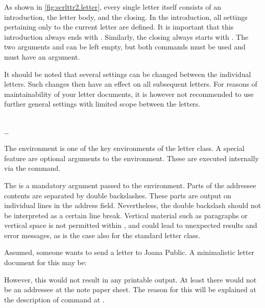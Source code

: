 As shown in \autoref{fig:scrlttr2.letter}, every single letter itself consists
of an introduction, the letter body, and the closing. In the introduction, all
settings pertaining only to the current letter are defined. It is important
that this introduction always ends with
. Similarly, the closing always starts with
. The two arguments  and
 can be left empty, but both commands must be used and must
have an argument.

It should be noted that several settings can be changed between the individual
letters. Such changes then have an effect on all subsequent letters. For
reasons of maintainability of your letter documents, it is however not
recommended to use further general settings with limited scope between the
letters.

\begin{Declaration}
  \\
  \quad\dots\\
\end{Declaration}
%
%
The  environment is one of the key environments of the
letter class. A special
 feature are optional arguments to the 
environment. These  are executed internally via the
 command.

The  is a mandatory argument passed to the
 environment. Parts of the addressee
contents are separated by double backslashes. These parts are output on
individual lines in the address field. Nevertheless, the double backslash
should not be interpreted as a certain line break. Vertical material such as
paragraphs or vertical space is not permitted within , and
could lead to unexpected results and error messages, as is the case also for
the standard letter class.

\begin{Example}
  \label{desc:scrlttr2.env.letter.example}%
  Assumed, someone wants to send a letter to Joana Public. A minimalistic
  letter document for this may be:
  However, this would not result in any printable output. At least there
  would not be an addressee at the note paper sheet. The reason for this will
  be explained at the description of command  at
  .
\end{Example}
%
%
%

